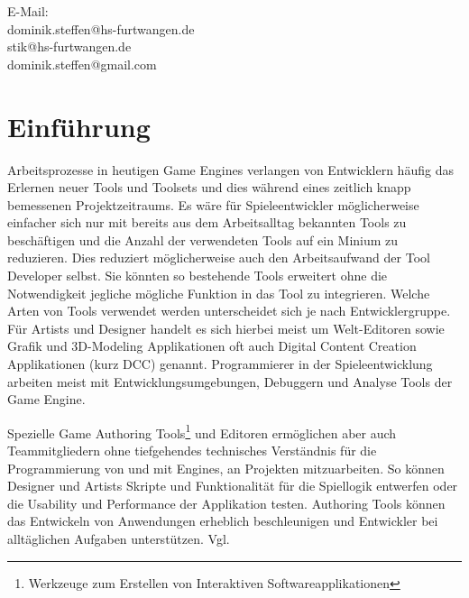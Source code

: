 \documentclass[pagesize, paper=a4, fontsize=12pt, titlepage=true, headings=small, headnosepline, abstractoff, liststotoc, nochapterprefix, plainheadsepline, twoside]{scrreprt}
\begin{document}
E-Mail:\\
dominik.steffen@hs-furtwangen.de\\
stik@hs-furtwangen.de\\
dominik.steffen@gmail.com\\
\endgroup
\newpage
\thispagestyle{empty}
\mbox{}

\begingroup
	\clearpage
	\renewcommand*{\chapterpagestyle}{empty}
	\pagestyle{empty}
	\tableofcontents
	\clearpage
\endgroup
\newpage
\thispagestyle{empty}
\mbox{}


\renewcommand*{\chapterpagestyle}{plain}
\pagestyle{plain}
\setcounter{page}{0}

\chapter{Einführung}
Arbeitsprozesse in heutigen Game Engines verlangen von Entwicklern häufig das Erlernen neuer Tools und Toolsets und dies während eines zeitlich knapp bemessenen Projektzeitraums. Es wäre für Spieleentwickler möglicherweise einfacher sich nur mit bereits aus dem Arbeitsalltag bekannten Tools zu beschäftigen und die Anzahl der verwendeten Tools auf ein Minium zu reduzieren. Dies reduziert möglicherweise auch den Arbeitsaufwand der Tool Developer selbst. Sie könnten so bestehende Tools erweitert ohne die Notwendigkeit jegliche mögliche Funktion in das Tool zu integrieren. Welche Arten von Tools verwendet werden unterscheidet sich je nach Entwicklergruppe. Für Artists und Designer handelt es sich hierbei meist um Welt-Editoren sowie Grafik und 3D-Modeling Applikationen oft auch Digital Content Creation Applikationen (kurz DCC) genannt. Programmierer in der Spieleentwicklung arbeiten meist mit Entwicklungsumgebungen, Debuggern und Analyse Tools der Game Engine.

Spezielle Game Authoring Tools\footnote{Werkzeuge zum Erstellen von Interaktiven Softwareapplikationen} und Editoren ermöglichen aber auch Teammitgliedern ohne tiefgehendes technisches Verständnis für die Programmierung von und mit Engines, an Projekten mitzuarbeiten. So können Designer und Artists Skripte und Funktionalität für die Spiellogik entwerfen oder die Usability und Performance der Applikation testen. Authoring Tools können das Entwickeln von Anwendungen erheblich beschleunigen und Entwickler bei alltäglichen Aufgaben unterstützen. Vgl. 
\end{document}
